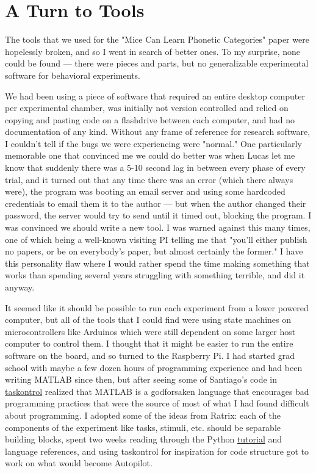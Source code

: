 \chapter*{A Turn to Tools}

The tools that we used for the "Mice Can Learn Phonetic Categories" paper were hopelessly broken, and so I went in search of better ones. To my surprise, none could be found --- there were pieces and parts, but no generalizable experimental software for behavioral experiments. 

We had been using a piece of software that required an entire desktop computer per experimental chamber, was initially not version controlled and relied on copying and pasting code on a flashdrive between each computer, and had no documentation of any kind. Without any frame of reference for research software, I couldn't tell if the bugs we were experiencing were "normal." One particularly memorable one that convinced me we could do better was when Lucas let me know that suddenly there was a 5-10 second lag in between every phase of every trial, and it turned out that any time there was an error (which there always were), the program was booting an email server and using some hardcoded credentials to email them it to the author --- but when the author changed their password, the server would try to send until it timed out, blocking the program. I was convinced we should write a new tool. I was warned against this many times, one of which being a well-known visiting PI telling me that "you'll either publish no papers, or be on everybody's paper, but almost certainly the former." I have this personality flaw where I would rather spend the time making something that works than spending several years struggling with something terrible, and did it anyway.

It seemed like it should be possible to run each experiment from a lower powered computer, but all of the tools that I could find were using state machines on microcontrollers like Arduinos which were still dependent on some larger host computer to control them. I thought that it might be easier to run the entire software on the board, and so turned to the Raspberry Pi. I had started grad school with maybe a few dozen hours of programming experience and had been writing MATLAB since then, but after seeing some of Santiago's code in \href{https://github.com/sjara/taskontrol}{taskontrol} realized that MATLAB is a godforsaken language that encourages bad programming practices that were the source of most of what I had found difficult about programming. I adopted some of the ideas from Ratrix: each of the components of the experiment like tasks, stimuli, etc. should be separable building blocks, spent two weeks reading through the Python \href{https://docs.python.org/3/tutorial/index.html}{tutorial} and language references, and using taskontrol for inspiration for code structure got to work on what would become Autopilot.

